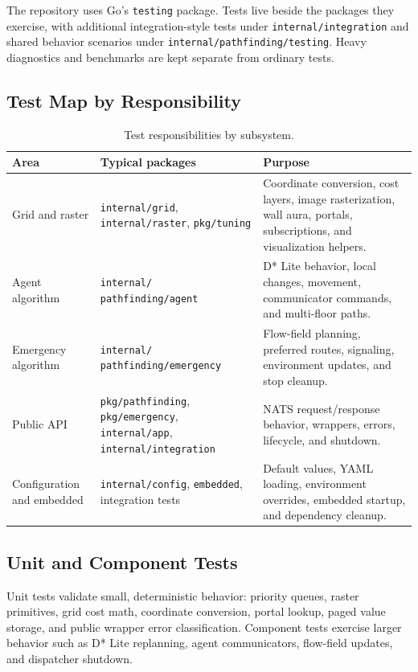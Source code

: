 \documentclass[12pt,a4paper]{report}
\begin{document}
The repository uses Go's \texttt{testing} package. Tests live beside the
packages they exercise, with additional integration-style tests under
\texttt{internal/integration} and shared behavior scenarios under
\texttt{internal/pathfinding/testing}. Heavy diagnostics and benchmarks are kept
separate from ordinary tests.

\subsection{Test Map by Responsibility}

\begin{table}[H]
\centering
\begin{tabular}{|p{}|p{}|p{}|}
\hline
\textbf{Area} & \textbf{Typical packages} & \textbf{Purpose} \\
\hline
Grid and raster &
\texttt{internal/grid}, \texttt{internal/raster}, \texttt{pkg/tuning} &
Coordinate conversion, cost layers, image rasterization, wall aura, portals,
subscriptions, and visualization helpers. \\
\hline
Agent algorithm &
\texttt{internal/} \newline \texttt{pathfinding/agent} &
D* Lite behavior, local changes, movement, communicator commands, and
multi-floor paths. \\
\hline
Emergency algorithm &
\texttt{internal/} \newline \texttt{pathfinding/emergency} &
Flow-field planning, preferred routes, signaling, environment updates, and stop
cleanup. \\
\hline
Public API &
\texttt{pkg/pathfinding}, \texttt{pkg/emergency}, \texttt{internal/app},
\texttt{internal/integration} &
NATS request/response behavior, wrappers, errors, lifecycle, and shutdown. \\
\hline
Configuration and embedded &
\texttt{internal/config}, \texttt{embedded}, integration tests &
Default values, YAML loading, environment overrides, embedded startup, and
dependency cleanup. \\
\hline
\end{tabular}
\caption{Test responsibilities by subsystem.}
\end{table}

\subsection{Unit and Component Tests}

Unit tests validate small, deterministic behavior: priority queues, raster
primitives, grid cost math, coordinate conversion, portal lookup, paged value
storage, and public wrapper error classification. Component tests exercise
larger behavior such as D* Lite replanning, agent communicators, flow-field
updates, and dispatcher shutdown.
\end{document}

